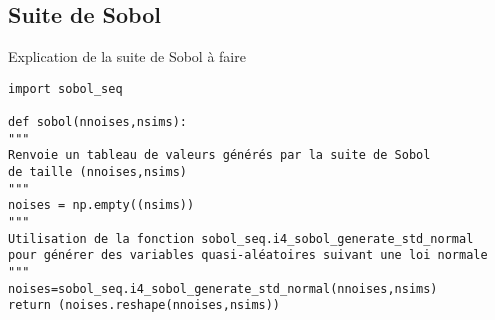 \documentclass[12pt]{report}
\begin{document}
\subsection{Suite de Sobol}
Explication de la suite de Sobol à faire
\begin{lstlisting}
import sobol_seq

def sobol(nnoises,nsims):
"""
Renvoie un tableau de valeurs générés par la suite de Sobol
de taille (nnoises,nsims)
"""
noises = np.empty((nsims))
"""
Utilisation de la fonction sobol_seq.i4_sobol_generate_std_normal
pour générer des variables quasi-aléatoires suivant une loi normale
"""
noises=sobol_seq.i4_sobol_generate_std_normal(nnoises,nsims)
return (noises.reshape(nnoises,nsims))

\end{lstlisting}
\end{document}
